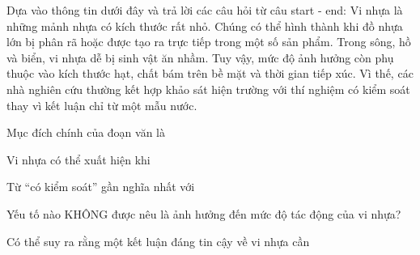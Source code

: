 \begin{baidoc}
\item[] Dựa vào thông tin dưới đây và trả lời các câu hỏi từ câu {start} - {end}:
Vi nhựa là những mảnh nhựa có kích thước rất nhỏ. Chúng có thể hình thành khi đồ nhựa lớn bị phân rã hoặc được tạo ra trực tiếp trong một số sản phẩm. Trong sông, hồ và biển, vi nhựa dễ bị sinh vật ăn nhầm. Tuy vậy, mức độ ảnh hưởng còn phụ thuộc vào kích thước hạt, chất bám trên bề mặt và thời gian tiếp xúc. Vì thế, các nhà nghiên cứu thường kết hợp khảo sát hiện trường với thí nghiệm có kiểm soát thay vì kết luận chỉ từ một mẫu nước.

\begin{ex}
Mục đích chính của đoạn văn là
\end{ex}

\begin{ex}
Vi nhựa có thể xuất hiện khi
\end{ex}

\begin{ex}
Từ “có kiểm soát” gần nghĩa nhất với
\end{ex}

\begin{ex}
Yếu tố nào KHÔNG được nêu là ảnh hưởng đến mức độ tác động của vi nhựa?
\end{ex}

\begin{ex}
Có thể suy ra rằng một kết luận đáng tin cậy về vi nhựa cần
\end{ex}
\end{baidoc}

